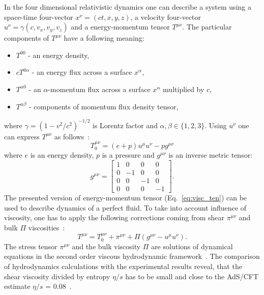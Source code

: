   In the four dimensional relativistic dynamics one can describe a system using a space-time four-vector $x^\nu=(ct,x,y,z)$, a velocity four-vector $u^\nu=\gamma(c,v_x,v_y,v_z)$ and a energy-momentum tensor $T^{\mu\nu}$.
  The particular components of $T^{\mu\nu}$ have a following meaning:
  \begin{itemize}
    \item $T^{00}$ - an energy density,
    \item $c T^{0\alpha}$ - an energy flux across a surface $x^\alpha$,
    \item $T^{\alpha0}$ - an $\alpha$-momentum flux across a surface  $x^\alpha$ multiplied by $c$,
    \item $T^{\alpha\beta}$ - components of momentum flux density tensor,
  \end{itemize}
  where $\gamma = (1-v^2/c^2)^{-1/2}$ is Lorentz factor and $\alpha,\beta \in \{1,2,3\}$.
  Using $u^\nu$ one can express $T^{\mu\nu}$ as follows~\cite{israel}:
  \begin{equation}
    \label{eq:visc_ten}
    T^{\mu\nu}_0 = (e+p)u^\mu u^\nu - pg^{\mu\nu}
  \end{equation}
  where $e$ is an energy density, $p$ is a pressure and $g^{\mu\nu}$ is an inverse metric tensor:
  \begin{equation}
    g^{\mu\nu} = 
    \begin{bmatrix}
      1 & 0 & 0 & 0 \\
      0 & -1 & 0 & 0 \\
      0 & 0 & -1 & 0 \\
      0 & 0 & 0 & -1
    \end{bmatrix} .
  \end{equation}
  The presented version of energy-momentum tensor (Eq.~\ref{eq:visc_ten}) can be used to describe dynamics of a perfect fluid.
  To take into account influence of viscosity, one has to apply the following corrections coming from shear $\pi^{\mu\nu}$ and bulk $\Pi$ viscosities~\cite{visc_hydro}:
  \begin{equation}
    T^{\mu\nu} = T_0^{\mu\nu} + \pi^{\mu\nu} + \Pi(g^{\mu\nu}-u^{\mu}u^{\nu}) .
  \end{equation}
  The stress tensor $\pi^{\mu\nu}$ and the bulk viscosity $\Pi$ are solutions of dynamical equations in the second order viscous hydrodynamic framework~\cite{israel}.
  The comparison of hydrodynamics calculations with the experimental results reveal, that the shear viscosity divided by entropy $\eta / s$ has to be small and close to the AdS/CFT estimate $\eta /s$ = 0.08~\cite{visc_hydro,adscft}.
  
